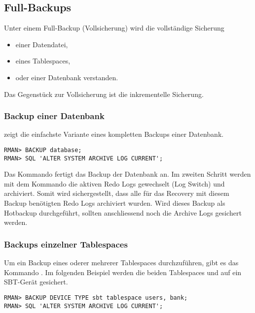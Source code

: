       \subsection{Full-Backups}
        Unter einem Full-Backup (Vollsicherung) wird die vollständige Sicherung
        \begin{itemize}
          \item einer Datendatei,
          \item eines Tablespaces,
          \item oder einer Datenbank verstanden.
        \end{itemize}
        Das Gegenstück zur Vollsicherung ist die inkrementelle Sicherung.
        \subsubsection{Backup einer Datenbank}
           zeigt die einfachste Variante eines kompletten Backups einer Datenbank.
          \begin{lstlisting}[caption={Backup einer ganzen Datenbank},label=admin1309,language=rman,emph={[9]ALTER,SYSTEM,ARCHIVE,LOG,CURRENT},emphstyle={[9]\color{magenta}\bfseries}]
RMAN> BACKUP database;
RMAN> SQL 'ALTER SYSTEM ARCHIVE LOG CURRENT';
          \end{lstlisting}
          Das Kommando  fertigt das Backup der Datenbank an. Im zweiten Schritt werden mit dem Kommando  die aktiven Redo Logs gewechselt (Log Switch) und archiviert. Somit wird sichergestellt, dass alle für das Recovery mit diesem Backup benötigten Redo Logs archiviert wurden. Wird dieses Backup als Hotbackup durchgeführt, sollten anschliessend noch die Archive Logs gesichert werden.
        \subsubsection{Backups einzelner Tablespaces}
          Um ein Backup eines oderer mehrerer Tablespaces durchzuführen, gibt es das Kommando . Im folgenden Beispiel werden die beiden Tablespaces  und  auf ein SBT-Gerät gesichert.
          \begin{lstlisting}[caption={Backup eines Tablespace},label=admin1310,language=rman,emph={[9]ALTER,SYSTEM,ARCHIVE,LOG,CURRENT},emphstyle={[9]\color{magenta}\bfseries}]
RMAN> BACKUP DEVICE TYPE sbt tablespace users, bank;
RMAN> SQL 'ALTER SYSTEM ARCHIVE LOG CURRENT';
          \end{lstlisting}
